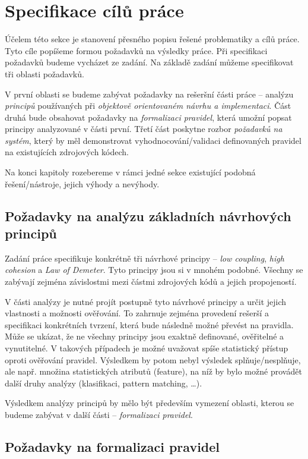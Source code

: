 \chapter{Specifikace cílů práce}

Účelem této sekce je stanovení přesného popisu řešené problematiky a cílů práce. Tyto cíle popíšeme formou požadavků na výsledky práce. Při specifikaci požadavků budeme vycházet ze zadání. Na základě zadání můžeme specifikovat tři oblasti požadavků.

V první oblasti se budeme zabývat požadavky na rešeršní části práce -- analýzu \emph{principů} používaných při \emph{objektově orientovaném návrhu a implementaci}. Část druhá bude obsahovat požadavky na \emph{formalizaci pravidel}, která umožní popsat principy analyzované v části první. Třetí část poskytne rozbor \emph{požadavků na systém}, který by měl demonstrovat vyhodnocování/validaci definovaných pravidel na existujících zdrojových kódech.

Na konci kapitoly rozebereme v rámci jedné sekce existující podobná řešení/nástroje, jejich výhody a nevýhody.

\section{Požadavky na analýzu základních návrhových principů}
\label{requirements-principle_analysis}
Zadání práce specifikuje konkrétně tři návrhové principy -- \emph{low coupling}, \emph{high cohesion} a \emph{Law of Demeter}. Tyto principy jsou si v mnohém podobné. Všechny se zabývají zejména závislostmi mezi částmi zdrojových kódů a jejich propojeností.

V části analýzy je nutné projít postupně tyto návrhové principy a určit jejich vlastnosti a možnosti ověřování. To zahrnuje zejména provedení rešerší a specifikaci konkrétních tvrzení, která bude následně možné převést na pravidla. Může se ukázat, že ne všechny principy jsou exaktně definované, ověřitelné a vynutitelné. V takových případech je možné uvažovat spíše statistický přístup oproti ověřování pravidel. Výsledkem by potom nebyl výsledek splňuje/nesplňuje, ale např. množina statistických atributů (feature), na níž by bylo možné provádět další druhy analýzy (klasifikaci, pattern matching, \ldots).

Výsledkem analýzy principů by mělo být především vymezení oblasti, kterou se budeme zabývat v další části -- \emph{formalizaci pravidel}.

\section{Požadavky na formalizaci pravidel}


